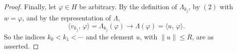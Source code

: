 \begin{proof}
Finally, let $\varphi \in H$ be arbitrary.  By the definition of $\Lambda_{k_j}$,
by $(2)$ with $w = \varphi$, and by the representation of $\Lambda$,
\[
  \langle v_{k_j},\, \varphi\rangle
    = \Lambda_{k_j}(\varphi)
    \longrightarrow \Lambda(\varphi)
    = \langle u,\, \varphi\rangle .
\]
So the indices $k_0 < k_1 < \cdots$ and the element $u$, with $\|u\| \leq R$,
are as asserted.
\end{proof}

